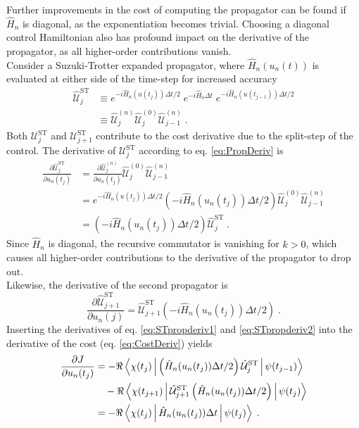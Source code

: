 \documentclass[%
 reprint,
 amsmath,amssymb,
 aps,
pra,
]{revtex4-1}
\begin{document}
Further improvements in the cost of computing the propagator can be found if $\hat{H}_n$ is diagonal, as the exponentiation becomes trivial. Choosing a diagonal control Hamiltonian also has profound impact on the  derivative of the propagator, as all higher-order contributions vanish.\\
Consider a Suzuki-Trotter expanded propagator, where $\hat{H}_n (u_n (t))$ is evaluated at either side of the time-step for increased accuracy
\begin{align}
	\hat{\mathcal{U}}_{j}^{\mathrm{ST}} &\equiv e^{ -i  \hat{H}_n (u (t_j)) \Delta t /2 } \; e^{ -i \hat{H}_0 \Delta t } \; e^{ -i  \hat{H}_n (u (t_{j-1}))  \Delta t /2 } \\
	& \equiv \hat{\mathcal{U}}_{j}^{(n)} \hat{\mathcal{U}}_{j}^{(0)} \hat{\mathcal{U}}_{j-1}^{(n)} \; .
\end{align}
Both $\mathcal{U}_{j}^{\mathrm{ST}}$ and $\mathcal{U}_{j+1}^{\mathrm{ST}}$ contribute to the cost derivative due to the split-step of the control.
The derivative of $\mathcal{U}_{j}^{\mathrm{ST}}$ according to eq. \eqref{eq:PropDeriv} is
\begin{align}
	\frac{\partial \hat{\mathcal{U}}_{j}^{\mathrm{ST}}}{\partial u_n (t_j)} &=  \frac{\partial \hat{\mathcal{U}}_{j}^{(n)}}{\partial u_n (t_j)} \hat{\mathcal{U}}_{j}^{(0)} \hat{\mathcal{U}}_{j-1}^{(n)} \nonumber \\
	&= e^{ -i  \hat{H}_n (u (t_j)) \Delta t /2 } \left( -i \hat{H}_n (u_n (t_j)) \Delta t /2 \right) \hat{\mathcal{U}}_{j}^{(0)} \hat{\mathcal{U}}_{j-1}^{(n)} \nonumber \\
	&= \left( -i \hat{H}_n (u_n (t_j)) \Delta t /2 \right) \hat{\mathcal{U}}_{j}^{\mathrm{ST}} \; . \label{eq:STpropderiv1}
\end{align}
Since $\hat{H}_n$ is diagonal, the recursive commutator is vanishing for $k > 0$, which causes all higher-order contributions to the derivative of the propagator to drop out.\\
Likewise, the derivative of the second propagator is
\begin{equation}
	\frac{\partial \hat{\mathcal{U}}_{j+1}^{\mathrm{ST}}}{\partial u_n (j)} =  \hat{\mathcal{U}}_{j+1}^{\mathrm{ST}} \left( -i \hat{H}_n (u_n (t_j)) \Delta t /2 \right) \; . \label{eq:STpropderiv2}
\end{equation}
Inserting the derivatives of eq. \eqref{eq:STpropderiv1} and \eqref{eq:STpropderiv2} into the derivative of the cost (eq. \eqref{eq:CostDeriv}) yields
\begin{align}
	\frac{\partial J}{\partial u_n (t_j)} &= - \Re \Braket{\chi (t_j) |  \left(  \hat{H}_n (u_n (t_j)) \Delta t /2 \right) \hat{\mathcal{U}}_{j}^{\mathrm{ST}} | \psi (t_{j-1})} \nonumber \\
	& \quad - \Re \Braket{\chi (t_{j+1}) | \hat{\mathcal{U}}_{j+1}^{\mathrm{ST}} \left(  \hat{H}_n (u_n (t_j)) \Delta t /2 \right) | \psi (t_{j})} \nonumber \\
	&= - \Re \Braket{\chi (t_j) | \hat{H}_n (u_n (t_j)) \Delta t | \psi (t_{j})} \; . \label{eq:STcostgrad}
\end{align}  
\end{document}
